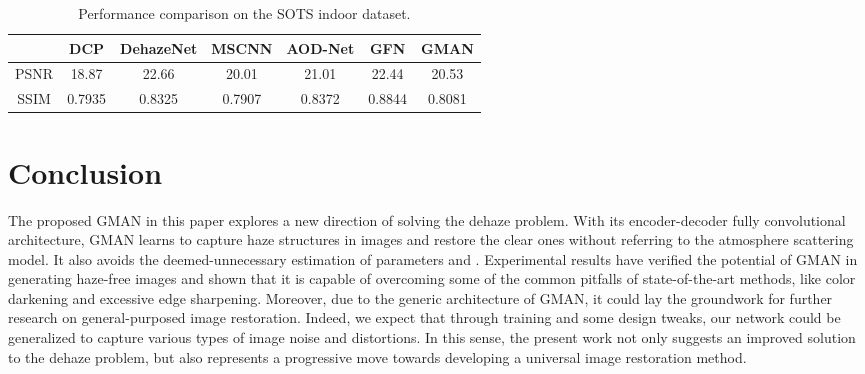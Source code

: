 \documentclass[journal]{IEEEtran}
\begin{document}
\begin{table}[!htbp]
	\centering
	\caption{Performance comparison on the SOTS indoor dataset.}
	\begin{tabular}{ccccccc}
\hline
		&DCP &DehazeNet &MSCNN &AOD-Net &GFN &GMAN\\ \hline
		PSNR &18.87 &22.66 &20.01 &21.01 &22.44 &20.53\\
		SSIM &0.7935 &0.8325 &0.7907 &0.8372 &0.8844 &0.8081\\ \hline
	\end{tabular}
	\label{t.2}
\end{table}













\section{Conclusion}
The proposed GMAN in this paper explores a new direction of solving the dehaze problem. With its encoder-decoder fully convolutional architecture, GMAN learns to capture haze structures in images and restore the clear ones without referring to the atmosphere scattering model. It also avoids the deemed-unnecessary estimation of parameters  and . Experimental results have verified the potential of GMAN in generating haze-free images and shown that it is capable of overcoming some of the common pitfalls of state-of-the-art  methods, like color darkening and excessive edge sharpening. Moreover, due to the generic architecture of GMAN, it could lay the groundwork for further research on general-purposed image restoration. Indeed, we expect that through training and some design tweaks, our network could be generalized to capture various types of image noise and distortions. In this sense, the present work not only suggests an improved solution to the dehaze problem, but also represents a progressive move towards developing a universal image restoration method.








\appendices





\ifCLASSOPTIONcaptionsoff
  \newpage
\fi








\end{document}
